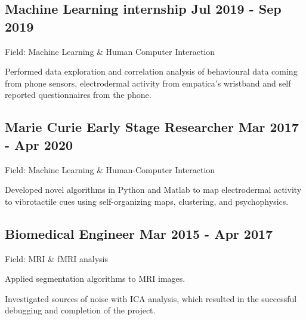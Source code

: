 \documentclass[a4paper,12pt]{article}
\begin{document}

\subsection{Machine Learning internship \hfill Jul 2019 - Sep 2019}
\vspace*{1pt}
Field: Machine Learning \& Human Computer Interaction \\
\vspace*{\spaceAfterField}
\begin{zitemize}
\item Performed data exploration and correlation analysis of behavioural data coming from phone sensors, electrodermal activity from empatica's wristband and self reported questionnaires from the phone.
\end{zitemize}
\vspace*{5pt}


\subsection{Marie Curie Early Stage Researcher \hfill Mar 2017 - Apr 2020}
\vspace*{1pt}
Field: Machine Learning \& Human-Computer Interaction
\vspace*{\spaceAfterField}
\begin{zitemize}
\item Developed novel algorithms in Python and Matlab to map electrodermal activity to vibrotactile cues using self-organizing maps, clustering, and psychophysics.
\end{zitemize}
\vspace*{5pt}



\subsection{Biomedical Engineer \hfill Mar 2015 - Apr 2017}
\vspace*{1pt}
Field: MRI \& fMRI analysis
\vspace*{\spaceAfterField}
\begin{zitemize}
\item Applied segmentation algorithms to MRI images.
\item Investigated sources of noise with ICA analysis, which resulted in the successful debugging and completion of the project.
\end{zitemize}
\end{document}
